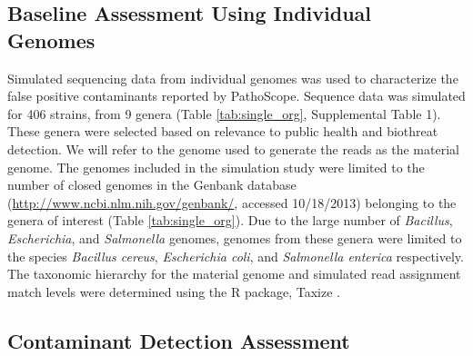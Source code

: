 \documentclass[fleqn,10pt,lineno]{wlpeerj}\usepackage[]{graphicx}\usepackage[]{color}
\begin{document}
\subsection*{Baseline Assessment Using Individual Genomes}
Simulated sequencing data from individual genomes was used to characterize the false positive contaminants reported by PathoScope.
Sequence data was simulated for 406 strains, from 9 genera (Table \ref{tab:single_org}, Supplemental Table 1).
These genera were selected based on relevance to public health and biothreat detection.
We will refer to the genome used to generate the reads as the material genome.
The genomes included in the simulation study were limited to the number of closed genomes in the Genbank database (\url{http://www.ncbi.nlm.nih.gov/genbank/}, accessed 10/18/2013) belonging to the genera of interest (Table \ref{tab:single_org}).
Due to the large number of \textit{Bacillus}, \textit{Escherichia}, and \textit{Salmonella} genomes, genomes from these genera were limited to the species \textit{Bacillus cereus}, \textit{Escherichia coli}, and \textit{Salmonella enterica} respectively.
The taxonomic hierarchy for the material genome and simulated read assignment match levels were determined using the R package, Taxize \citep{TaxizeArticle,TaxizeManual}.

\subsection*{Contaminant Detection Assessment}
\end{document}
